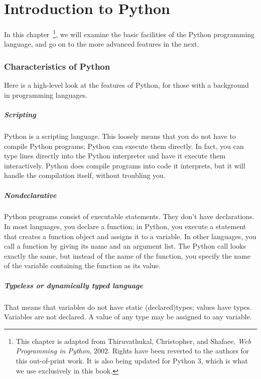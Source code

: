 \chapter{Introduction to Python}

\def\tightlist{}

In this chapter~\footnote{This chapter is adapted from Thiruvathukal, Christopher, and Shafaee, \emph{Web Programming in Python}, 2002. Rights have been reverted to the authors for this out-of-print work. It is also being updated for Python 3, which is what we use exclusively in this book.}, we will
examine the basic facilities of the Python programming language, and go
on to the more advanced features in the next.

\subsection{Characteristics of Python}
\label{characteristics-of-python}

Here is a high-level look at the
features of Python, for those with a background in programming
languages.

\paragraph{Scripting} 
Python is a scripting language.
This loosely means that you do not have to compile Python programs;
Python can execute them directly. In fact, you can type lines directly
into the Python interpreter and have it execute them interactively.
Python does compile programs into code it interprets, but it will handle
the compilation itself, without troubling you.

\paragraph{Nondeclarative}
Python programs consist of
executable statements. They don't have declarations. In most languages,
you declare a function; in Python, you execute a statement that creates
a function object and assigns it to a variable. In other languages, you
call a function by giving its name and an argument list. The Python call
looks exactly the same, but instead of the name of the function, you
specify the name of the variable containing the function as its value.

\paragraph{Typeless or dynamically typed language} That means that variables do not have
static (declared)types; values have types. Variables are not declared. A value of any
type may be assigned to any variable.

